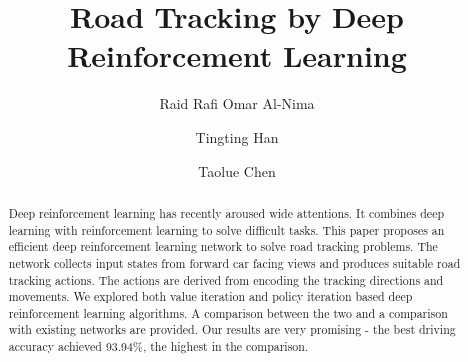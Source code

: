 \documentclass{svproc}
\begin{document}
\mainmatter              %
%
\title{Road Tracking by Deep Reinforcement Learning 
}
%
%
\author{Raid Rafi Omar Al-Nima \and Tingting Han \and
Taolue Chen}
%
%
%

\maketitle              %

\begin{abstract}
Deep reinforcement learning has recently aroused wide attentions. It combines deep learning with reinforcement learning to solve difficult tasks. This paper proposes an efficient deep reinforcement learning network to solve road tracking problems. The network collects input states from forward car facing views and produces suitable road tracking actions. The actions are derived from encoding the tracking directions and movements. We explored both value iteration and policy iteration based deep reinforcement learning algorithms. A comparison between the two and a comparison with existing networks are provided. Our results are very promising - the best driving accuracy achieved 93.94\%, the highest in the comparison. 
\end{abstract}

\end{document}
